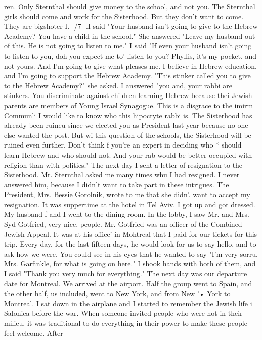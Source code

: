 {ren. Only Sternthal should give money to the school, and not you. The Sternthal girls 
should come and work for the Sisterhood. But they don't want to come. They are bigshoter 
I. 
-/7- 
.I said "Your husband isn't going to give to the Hebrew Academy? You have a child 
in the school." She answered "Leave my husband out of this. He is not going to listen 
to me." I said "If even your husband isn't going to listen to you, doh you expect me to' 
listen to you? Phyllis, it's my pocket, and not yours. And I'm going to give what 
pleases me. I believe in Hebrew education, and I'm going to support the Hebrew Academy. 
"This stinker called you to give to the Hebrew Academy?" she asked. I answered "you and, 
your rabbi are stinkers. You discriminate against children learning Hebrew because thei 
Jewish 
parents are members of Young Israel Synagogue. This is a disgrace to the imirm Communli 
I would like to know who this hipocryte rabbi is. The Sisterhood has already been ruineu 
since we elected you as President last year because no-one else wanted the post. But wi 
this question of the schools, the Sisterhood will be ruined even further. Don't think 
f 
you're an expert in deciding who * should learn Hebrew and who should not. And your rab 
would be better occupied with religion than with politics." 
The next day I sent a letter of resignation to the Sisterhood. Mr. Sternthal asked 
me many times whu I had resigned. I never answered him, because I didn't want to take 
part in these intrigues. The President, Mrs. Bessie Gorolnik, wrote to me that she didn'. 
want to accept my resignation. 
It was suppertime at the hotel in Tel Aviv. I got up and got dressed. My husband f 
and I went to the dining room. In the lobby, I saw Mr. and Mrs. Syd Gotfried, very nice, 
people. Mr. Gotfried was an officer of the Combined Jewish Appeal. It was at his office' 
in Mohtreal that I paid for our tickets for this trip. Every day, for the last fifteen 
days, he would look for us to say hello, and to ask how we were. You could see in his 
eyes that he wanted to say "I'm very sorru, Mrs. Garfinkle, for what is going on here." 
I shook hands with both of them, and I said "Thank you very much for everything." 
The next day was our departure date for Montreal. We arrived at the airport. Half 
the group went to Spain, and the other half, us included, went to New York, and from New '• 
York to Montreal. I sat down in the airplane and I started to remember the Jewish life i 
Salonica before the war. 
When someone invited people who were not in their milieu, it was traditional to do 
everything in their power to make these people feel welcome. After 
}
